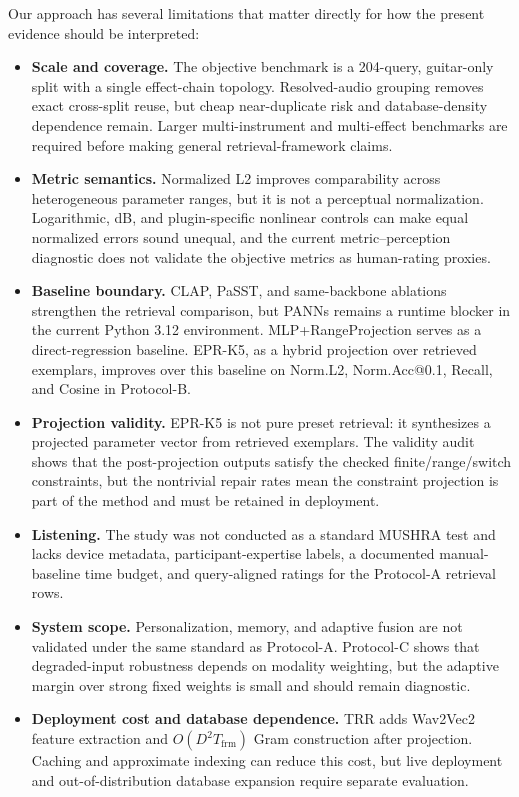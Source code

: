 Our approach has several limitations that matter directly for how the present evidence should be interpreted:
\begin{itemize}
	\item \textbf{Scale and coverage.} The objective benchmark is a 204-query, guitar-only split with a single effect-chain topology. Resolved-audio grouping removes exact cross-split reuse, but cheap near-duplicate risk and database-density dependence remain. Larger multi-instrument and multi-effect benchmarks are required before making general retrieval-framework claims.
	\item \textbf{Metric semantics.} Normalized L2 improves comparability across heterogeneous parameter ranges, but it is not a perceptual normalization. Logarithmic, dB, and plugin-specific nonlinear controls can make equal normalized errors sound unequal, and the current metric--perception diagnostic does not validate the objective metrics as human-rating proxies.
	\item \textbf{Baseline boundary.} CLAP, PaSST, and same-backbone ablations strengthen the retrieval comparison, but PANNs remains a runtime blocker in the current Python 3.12 environment. MLP+RangeProjection serves as a direct-regression baseline. EPR-K5, as a hybrid projection over retrieved exemplars, improves over this baseline on Norm.L2, Norm.Acc@0.1, Recall, and Cosine in Protocol-B.
	\item \textbf{Projection validity.} EPR-K5 is not pure preset retrieval: it synthesizes a projected parameter vector from retrieved exemplars. The validity audit shows that the post-projection outputs satisfy the checked finite/range/switch constraints, but the nontrivial repair rates mean the constraint projection is part of the method and must be retained in deployment.
	\item \textbf{Listening.} The study was not conducted as a standard MUSHRA test and lacks device metadata, participant-expertise labels, a documented manual-baseline time budget, and query-aligned ratings for the Protocol-A retrieval rows.
	\item \textbf{System scope.} Personalization, memory, and adaptive fusion are not validated under the same standard as Protocol-A. Protocol-C shows that degraded-input robustness depends on modality weighting, but the adaptive margin over strong fixed weights is small and should remain diagnostic.
	\item \textbf{Deployment cost and database dependence.} TRR adds Wav2Vec2 feature extraction and $O(D^2T_{\text{frm}})$ Gram construction after projection. Caching and approximate indexing can reduce this cost, but live deployment and out-of-distribution database expansion require separate evaluation.
\end{itemize}

